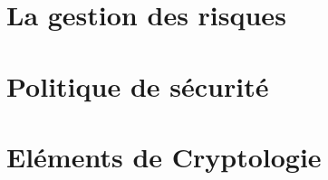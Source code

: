 

\chapter{La gestion des risques}

%

\chapter{Politique de sécurité}

%
%
%

\chapter{Eléments de Cryptologie}

%

